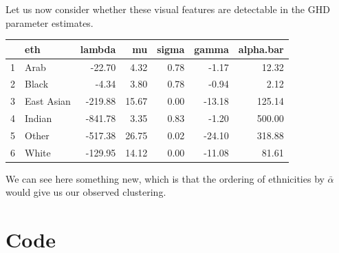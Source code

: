 \documentclass{amsart}
\begin{document}
Let us now consider whether these visual features are detectable in the GHD parameter estimates.

\begin{table}[ht]
\centering
\begin{tabular}{rlrrrrr}
  \hline
 & eth & lambda & mu & sigma & gamma & alpha.bar \\ 
  \hline
1 & Arab & -22.70 & 4.32 & 0.78 & -1.17 & 12.32 \\ 
  2 & Black & -4.34 & 3.80 & 0.78 & -0.94 & 2.12 \\ 
  3 & East Asian & -219.88 & 15.67 & 0.00 & -13.18 & 125.14 \\ 
  4 & Indian & -841.78 & 3.35 & 0.83 & -1.20 & 500.00 \\ 
  5 & Other & -517.38 & 26.75 & 0.02 & -24.10 & 318.88 \\ 
  6 & White & -129.95 & 14.12 & 0.00 & -11.08 & 81.61 \\ 
   \hline
\end{tabular}
\end{table}

We can see here something new, which is that the ordering of ethnicities by $\bar{\alpha}$ would give us our observed clustering.

\section{Code}
\end{document}
